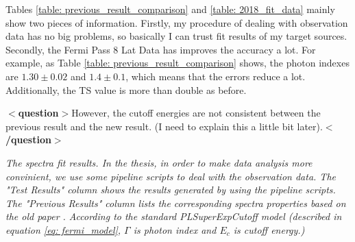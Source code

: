 \documentclass[12pt]{report}
\newcommand{\mycaption}[1]{\caption{\textit{\footnotesize #1}}}
\newcommand{\question}[1]{
  $<$\textbf{question}$>$#1$<$\textbf{/question}$>$
}
\newcommand{\change}[1]{
  $<$\colorbox{red}{\textbf{change}}$>$#1$<$\colorbox{red}{\textbf{/change}}$>$
}
\begin{document}
          Tables \ref{table: previous_result_comparison} and \ref{table: 2018_fit_data} mainly 
          show two pieces of information. Firstly, my procedure of dealing with observation data has no
          big problems, so basically I can trust fit results of my target sources. Secondly, the Fermi 
          Pass 8 Lat Data has improves the accuracy a lot. For example, as Table 
          \ref{table: previous_result_comparison} shows, the photon indexes are 
          $1.30\pm0.02$ and $1.4\pm0.1$, which means that the errors reduce a lot. Additionally, the TS 
          value is more than double as before.
          \question{However, the cutoff energies are not consistent between the previous result and the new result.
            (I need to explain this a little bit later).}
          \vspace{1cm} 
          \begin{table}[!ht]
            \centering
            \vspace{0.5cm}
              \centering
              \mycaption{The spectra fit results. In the thesis, in order to make data analysis more 
                convinient, we use some pipeline scripts to deal with the observation data. 
                The "Test Results" column
                shows the results generated by using the pipeline scripts. The "Previous Results" column lists the 
                corresponding spectra properties based on the old paper \cite{0067-0049-208-2-17}.
                According to the standard PLSuperExpCutoff model (described in equation \ref{eq: fermi_model}, 
                $\Gamma$ is photon index and $E_c$ is cutoff energy.)}
              \label{table: previous_result_comparison}
          \end{table}
          \vspace{1cm}            
\end{document}
